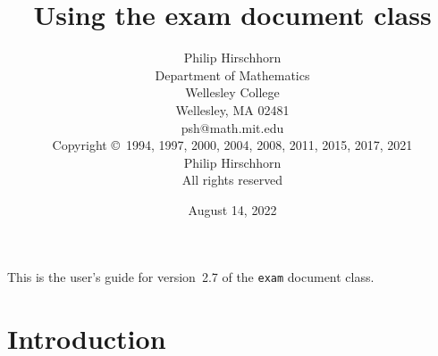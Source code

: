 \documentclass[12pt]{exam}
\newcommand{\docversion}{2.7}
\newcommand{\docdate}{August 14, 2022}
\begin{document}
\title{Using the exam document class}

\author{Philip Hirschhorn\\
  Department of Mathematics\\
  Wellesley College\\
  Wellesley, MA 02481\\
  psh@math.mit.edu\\[\bigskipamount]
  Copyright \copyright~1994, 1997, 2000, 2004, 2008, 2011, 2015, 2017,
  2021\\
  Philip Hirschhorn\\
  All rights reserved}

\date{\docdate}

\maketitle

\begin{center}
  \small
  This is the user's guide for version~\docversion{} of the
  \verb"exam" document class. 
\end{center}

\tableofcontents

\section{Introduction}
\end{document}
